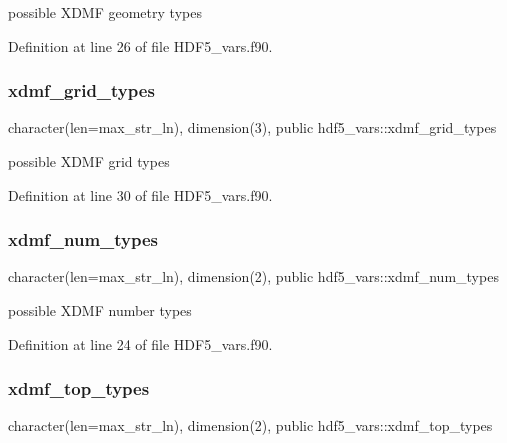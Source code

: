 possible X\+D\+MF geometry types 



Definition at line 26 of file H\+D\+F5\+\_\+vars.\+f90.

\mbox{\label{namespacehdf5__vars_ab7b59b4afbcaff92aa1c236c23a4bf58}} 
\subsubsection{\texorpdfstring{xdmf\+\_\+grid\+\_\+types}{xdmf\_grid\_types}}
{\footnotesize\ttfamily character(len=max\+\_\+str\+\_\+ln), dimension(3), public hdf5\+\_\+vars\+::xdmf\+\_\+grid\+\_\+types}



possible X\+D\+MF grid types 



Definition at line 30 of file H\+D\+F5\+\_\+vars.\+f90.

\mbox{\label{namespacehdf5__vars_ad8c38b66b3e9b402f05e7e7a36415fb3}} 
\subsubsection{\texorpdfstring{xdmf\+\_\+num\+\_\+types}{xdmf\_num\_types}}
{\footnotesize\ttfamily character(len=max\+\_\+str\+\_\+ln), dimension(2), public hdf5\+\_\+vars\+::xdmf\+\_\+num\+\_\+types}



possible X\+D\+MF number types 



Definition at line 24 of file H\+D\+F5\+\_\+vars.\+f90.

\mbox{\label{namespacehdf5__vars_ad25ea0a5a9a4bb3f9248a7fa61ea1363}} 
\subsubsection{\texorpdfstring{xdmf\+\_\+top\+\_\+types}{xdmf\_top\_types}}
{\footnotesize\ttfamily character(len=max\+\_\+str\+\_\+ln), dimension(2), public hdf5\+\_\+vars\+::xdmf\+\_\+top\+\_\+types}



